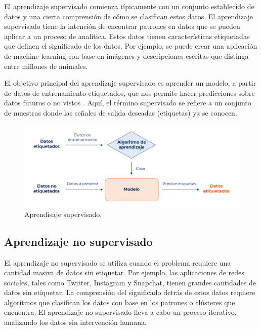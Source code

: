 El aprendizaje supervisado comienza típicamente con un conjunto establecido de datos y una cierta comprensión de cómo se clasifican estos datos. El aprendizaje supervisado tiene la intención de encontrar patrones en datos que se pueden aplicar a un proceso de analítica. Estos datos tienen características etiquetadas que definen el significado de los datos. Por ejemplo, se puede crear una aplicación de machine learning con base en imágenes y descripciones escritas que distinga entre millones de animales\cite{ibm}.

\vspace{1\baselineskip}
El objetivo principal del aprendizaje supervisado es aprender un modelo, a partir de datos de entrenamiento etiquetados, que nos permite hacer predicciones sobre datos futuros o no vistos \cite{mirjalili2020python}. Aquí, el término supervisado se refiere a un conjunto de muestras donde las señales
de salida deseadas (etiquetas) ya se conocen.

\begin{figure}[H]
  \begin{center}
    \includegraphics[scale=0.60]{./aprendisaje_supervisado.png}
    \caption{Aprendisaje supervisado\cite{decide}.}
    \label{fig:aprendisajesupervisado}
  \end{center}
\end{figure}

\subsection{Aprendizaje no supervisado}

El aprendizaje no supervisado se utiliza cuando el problema requiere una cantidad masiva de datos sin etiquetar. Por ejemplo, las aplicaciones de redes sociales, tales como Twitter, Instagram y Snapchat, tienen grandes cantidades de datos sin etiquetar. La comprensión del significado detrás de estos datos requiere algoritmos que clasifican los datos con base en los patrones o clústeres que encuentra. El aprendizaje no supervisado lleva a cabo un proceso iterativo, analizando los datos sin intervención humana\cite{ibm}.

